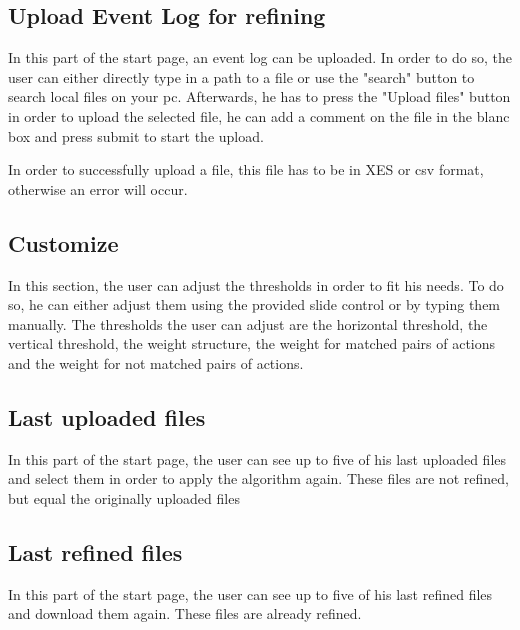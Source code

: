 \documentclass[notitlepage]{article}
\begin{document}
\begin{flushleft}
\subsection{Upload Event Log for refining}
In this part of the start page, an event log can be uploaded. In order to do so, the user can either directly type in a path to a file or use the "search" button to search local files on your pc. Afterwards, he has to press the "Upload files" button in order to upload the selected file, he can add a comment on the file in the blanc box and press submit to start the upload. 

In order to successfully upload a file, this file has to be in XES or csv format, otherwise an error will occur. 

\subsection{Customize}
In this section, the user can adjust the thresholds in order to fit his needs. To do so, he can either adjust them using the provided slide control or by typing them manually. The thresholds the user can adjust are the horizontal threshold, the vertical threshold, the weight structure, the weight for matched pairs of actions and the weight for not matched pairs of actions.

\subsection{Last uploaded files}
In this part of the start page, the user can see up to five of his last uploaded files and select them in order to apply the algorithm again. These files are not refined, but equal the originally uploaded files

\subsection{Last refined files}
In this part of the start page, the user can see up to five of his last refined files and download them again. These files are already refined.



\end{flushleft}
%

\end{document}
